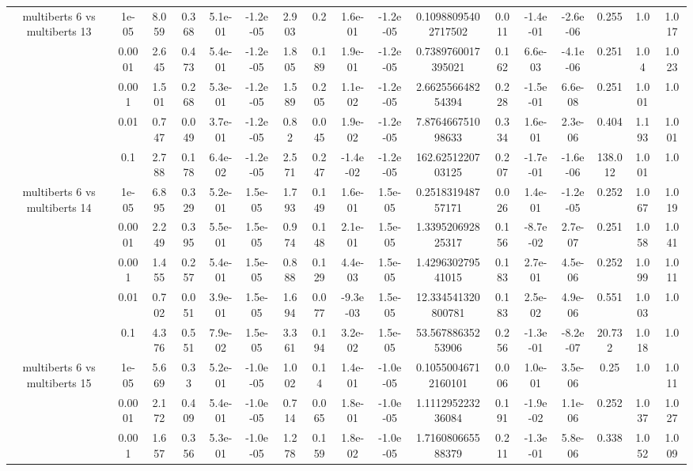 \begin{tabular}{|c|c|c|c|c|c|c|c|c|c|c|c|c|c|c|c|c|}
\hline
\multirow{5}{*}{multiberts 6 vs multiberts 13} & 1e-05 & 8.059 & 0.368 & 5.1e-01 & -1.2e-05 & 2.903 & 0.2 & 1.6e-01 & -1.2e-05 & 0.10988095402717502 & 0.011 & -1.4e-01 & -2.6e-06 & 0.255 & 1.0 & 1.017 \\
 & 0.0001 & 2.645 & 0.473 & 5.4e-01 & -1.2e-05 & 1.805 & 0.189 & 1.9e-01 & -1.2e-05 & 0.7389760017395021 & 0.162 & 6.6e-03 & -4.1e-06 & 0.251 & 1.04 & 1.023 \\
 & 0.001 & 1.501 & 0.268 & 5.3e-01 & -1.2e-05 & 1.589 & 0.205 & 1.1e-02 & -1.2e-05 & 2.662556648254394 & 0.228 & -1.5e-01 & 6.6e-08 & 0.251 & 1.001 & 1.0 \\
 & 0.01 & 0.747 & 0.049 & 3.7e-01 & -1.2e-05 & 0.82 & 0.045 & 1.9e-02 & -1.2e-05 & 7.876466751098633 & 0.334 & 1.6e-01 & 2.3e-06 & 0.404 & 1.193 & 1.001 \\
 & 0.1 & 2.788 & 0.178 & 6.4e-02 & -1.2e-05 & 2.571 & 0.247 & -1.4e-02 & -1.2e-05 & 162.6251220703125 & 0.207 & -1.7e-01 & -1.6e-06 & 138.012 & 1.001 & 1.0 \\
\hline
\multirow{5}{*}{multiberts 6 vs multiberts 14} & 1e-05 & 6.895 & 0.329 & 5.2e-01 & 1.5e-05 & 1.793 & 0.149 & 1.6e-01 & 1.5e-05 & 0.251831948757171 & 0.026 & 1.4e-01 & -1.2e-05 & 0.252 & 1.067 & 1.019 \\
 & 0.0001 & 2.249 & 0.395 & 5.5e-01 & 1.5e-05 & 0.974 & 0.148 & 2.1e-01 & 1.5e-05 & 1.339520692825317 & 0.156 & -8.7e-02 & 2.7e-07 & 0.251 & 1.058 & 1.041 \\
 & 0.001 & 1.455 & 0.257 & 5.4e-01 & 1.5e-05 & 0.888 & 0.129 & 4.4e-03 & 1.5e-05 & 1.429630279541015 & 0.183 & 2.7e-01 & 4.5e-06 & 0.252 & 1.099 & 1.011 \\
 & 0.01 & 0.702 & 0.051 & 3.9e-01 & 1.5e-05 & 1.694 & 0.077 & -9.3e-03 & 1.5e-05 & 12.334541320800781 & 0.183 & 2.5e-02 & 4.9e-06 & 0.551 & 1.003 & 1.0 \\
 & 0.1 & 4.376 & 0.551 & 7.9e-02 & 1.5e-05 & 3.361 & 0.194 & 3.2e-02 & 1.5e-05 & 53.56788635253906 & 0.256 & -1.3e-01 & -8.2e-07 & 20.732 & 1.018 & 1.0 \\
\hline
\multirow{5}{*}{multiberts 6 vs multiberts 15} & 1e-05 & 5.669 & 0.33 & 5.2e-01 & -1.0e-05 & 1.002 & 0.14 & 1.4e-01 & -1.0e-05 & 0.10550046712160101 & 0.006 & 1.0e-01 & 3.5e-06 & 0.25 & 1.0 & 1.011 \\
 & 0.0001 & 2.172 & 0.409 & 5.4e-01 & -1.0e-05 & 0.714 & 0.065 & 1.8e-01 & -1.0e-05 & 1.111295223236084 & 0.191 & -1.9e-02 & 1.1e-06 & 0.252 & 1.037 & 1.027 \\
 & 0.001 & 1.657 & 0.356 & 5.3e-01 & -1.0e-05 & 1.278 & 0.159 & 1.8e-02 & -1.0e-05 & 1.716080665588379 & 0.211 & -1.3e-01 & 5.8e-06 & 0.338 & 1.052 & 1.009 \\

\end{tabular}

